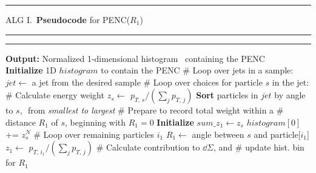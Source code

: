 \vspace{15pt}



\begin{table}%
\hspace{-40pt}
\begin{minipage}{0.58\textwidth}
\hrule height 1.3pt
\vspace{4pt}
{
    \hypertarget{alg:penc}{ALG I.}\,
    \textbf{Pseudocode} for PENC($R_1$)
}
\vspace{4pt}
\hrule
\hrule
\vspace{5pt}
\begin{algorithmic}[1]
    \State \textbf{Output:} Normalized 1-dimensional histogram
    \State \qquad\qquad\,{}
    containing the PENC
    \\
    \State
    \textbf{Initialize} 1D $histogram$ to contain the PENC
    \State \textcolor{codegreen!80!black}{\# Loop over jets in a sample:}
        \State $jet \gets$ a jet from the desired sample
        \State \textcolor{codegreen!80!black}{\# Loop over choices for particle $s$ in the jet:}
            \State \textcolor{codegreen!80!black}{\# Calculate energy weight}
            \State $z_s \gets $ \(p_{T,\, s}/(\sum_j p_{T,\,j})\)
            \State \textbf{Sort} particles in $jet$ by angle to $s$,
            \State
            \qquad\,\,from \textit{smallest to largest}
            \State \textcolor{codegreen!80!black}{\# Prepare to record total weight within a}
            \State \textcolor{codegreen!80!black}{\# distance \(R_1\) of \(s\), beginning with \(R_1=0\)}
            \State \textbf{Initialize} $sum\_z_1 \gets z_s$
                \State
                $histogram[0]$
                +=
                $z_s^N$
            \State \textcolor{codegreen!80!black}{\# Loop over remaining particles $i_1$}
                \State $R_1 \gets$ angle between $s$ and particle[$i_1$]
                \State $z_1 \gets $ \(p_{T,\, i_1}/(\sum_j p_{T,\,j})\)
                \State \textcolor{codegreen!80!black}{\# Calculate contribution to $\dd\Sigma$, and}
                \State \textcolor{codegreen!80!black}{\# update hist. bin for $R_1$}

\end{algorithmic}
\end{minipage}
\end{table}
